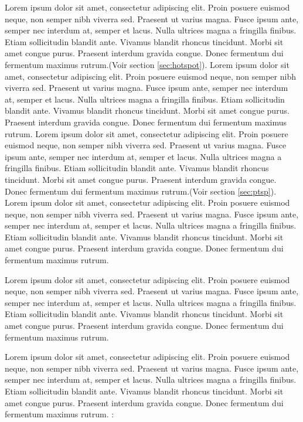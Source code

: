 \medskip

Lorem ipsum dolor sit amet, consectetur adipiscing elit. Proin posuere euismod neque, non semper nibh viverra sed. Praesent ut varius magna. Fusce ipsum ante, semper nec interdum at, semper et lacus. Nulla ultrices magna a fringilla finibus. Etiam sollicitudin blandit ante. Vivamus blandit rhoncus tincidunt. Morbi sit amet congue purus. Praesent interdum gravida congue. Donec fermentum dui fermentum maximus rutrum.(Voir section \ref{sec:hotspot}). Lorem ipsum dolor sit amet, consectetur adipiscing elit. Proin posuere euismod neque, non semper nibh viverra sed. Praesent ut varius magna. Fusce ipsum ante, semper nec interdum at, semper et lacus. Nulla ultrices magna a fringilla finibus. Etiam sollicitudin blandit ante. Vivamus blandit rhoncus tincidunt. Morbi sit amet congue purus. Praesent interdum gravida congue. Donec fermentum dui fermentum maximus rutrum.
\medskip
Lorem ipsum dolor sit amet, consectetur adipiscing elit. Proin posuere euismod neque, non semper nibh viverra sed. Praesent ut varius magna. Fusce ipsum ante, semper nec interdum at, semper et lacus. Nulla ultrices magna a fringilla finibus. Etiam sollicitudin blandit ante. Vivamus blandit rhoncus tincidunt. Morbi sit amet congue purus. Praesent interdum gravida congue. Donec fermentum dui fermentum maximus rutrum.(Voir section \ref{sec:ptsp}). Lorem ipsum dolor sit amet, consectetur adipiscing elit. Proin posuere euismod neque, non semper nibh viverra sed. Praesent ut varius magna. Fusce ipsum ante, semper nec interdum at, semper et lacus. Nulla ultrices magna a fringilla finibus. Etiam sollicitudin blandit ante. Vivamus blandit rhoncus tincidunt. Morbi sit amet congue purus. Praesent interdum gravida congue. Donec fermentum dui fermentum maximus rutrum.

\medskip

Lorem ipsum dolor sit amet, consectetur adipiscing elit. Proin posuere euismod neque, non semper nibh viverra sed. Praesent ut varius magna. Fusce ipsum ante, semper nec interdum at, semper et lacus. Nulla ultrices magna a fringilla finibus. Etiam sollicitudin blandit ante. Vivamus blandit rhoncus tincidunt. Morbi sit amet congue purus. Praesent interdum gravida congue. Donec fermentum dui fermentum maximus rutrum.

\medskip

Lorem ipsum dolor sit amet, consectetur adipiscing elit. Proin posuere euismod neque, non semper nibh viverra sed. Praesent ut varius magna. Fusce ipsum ante, semper nec interdum at, semper et lacus. Nulla ultrices magna a fringilla finibus. Etiam sollicitudin blandit ante. Vivamus blandit rhoncus tincidunt. Morbi sit amet congue purus. Praesent interdum gravida congue. Donec fermentum dui fermentum maximus rutrum. :

